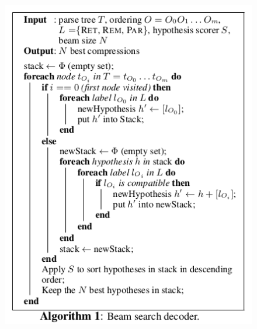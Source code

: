 \documentclass[xcolor={table}]{beamer}
\begin{document}
\begin{frame}{\cite{wang2013sentence}}
\begin{figure}[h]
\centering
\includegraphics[scale=.3]{images/algo1-wang13} 
\end{figure}
\end{frame}
\end{document}

